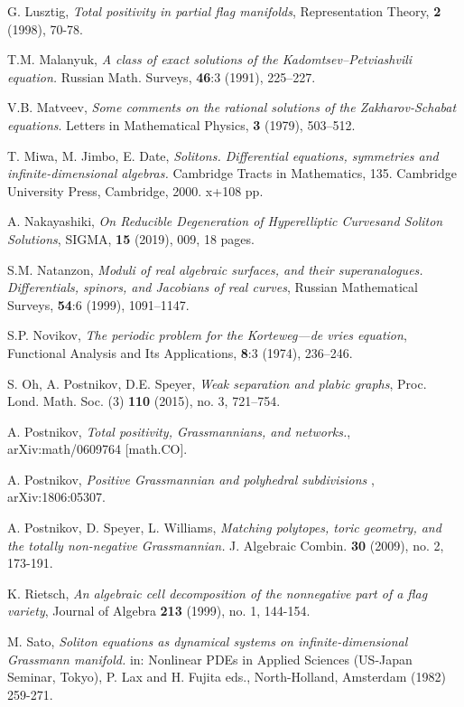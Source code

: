 \documentclass[11pt]{amsart}
\theoremstyle{plain}
\numberwithin{equation}{section}
\begin{document}
\begin{thebibliography}{111}
 G. Lusztig, {\em Total positivity in partial flag manifolds}, Representation Theory, {\bf 2} (1998),
70-78.

 T.M. Malanyuk, {\em A class of exact solutions of the Kadomtsev–Petviashvili equation.}  Russian Math. Surveys, {\bf 46}:3 (1991), 225--227.

 V.B. Matveev, {\em Some  comments on the rational solutions of the Zakharov-Schabat equations}.  Letters in Mathematical Physics, {\bf 3} (1979), 
503--512. 

 T. Miwa, M. Jimbo, E. Date, {\em Solitons. Differential equations, symmetries and infinite-dimensional algebras.} Cambridge Tracts in Mathematics, 135. Cambridge University Press, Cambridge, 2000. x+108 pp.

 A. Nakayashiki, {\em On Reducible Degeneration of Hyperelliptic Curvesand Soliton Solutions}, SIGMA, {\bf 15} (2019), 009, 18 pages.

 S.M. Natanzon, {\em Moduli of real algebraic surfaces, and their superanalogues. Differentials, spinors, and Jacobians of real curves}, Russian Mathematical Surveys, 
{\bf 54}:6 (1999), 1091--1147.

 S.P. Novikov, {\em The periodic problem for the Korteweg—de vries equation}, Functional Analysis and Its Applications,  {\bf 8}:3 (1974), 236--246.

 S. Oh, A. Postnikov, D.E. Speyer, {\em Weak separation and plabic graphs}, Proc. Lond. Math. Soc. (3) {\bf 110} (2015), no. 3, 721--754.

 A. Postnikov, {\em Total positivity, Grassmannians, and networks.}, arXiv:math/0609764 [math.CO].

 A. Postnikov, {\em Positive Grassmannian and polyhedral subdivisions} , arXiv:1806:05307.

 A. Postnikov, D. Speyer, L. Williams, {\em Matching polytopes, toric geometry, and the totally non-negative Grassmannian.} J. Algebraic Combin. {\bf 30} (2009), no. 2, 173-191.

 K. Rietsch, {\em An algebraic cell decomposition of the nonnegative part of a flag variety},
Journal of Algebra {\bf 213} (1999), no. 1, 144-154.

  M. Sato,  {\em Soliton equations as dynamical systems on infinite-dimensional
Grassmann manifold.} in: Nonlinear PDEs in Applied Sciences (US-Japan Seminar,
Tokyo), P. Lax and H. Fujita eds., North-Holland, Amsterdam
(1982) 259-271. 


\end{thebibliography}
\end{document}
